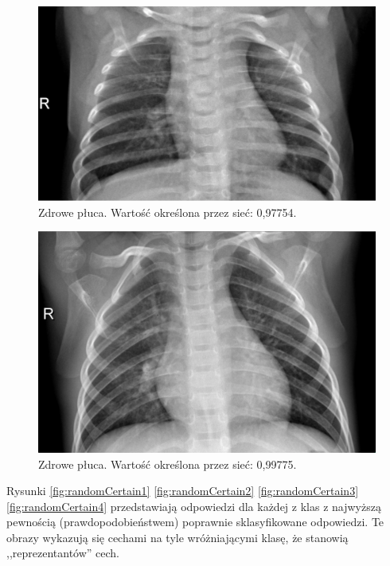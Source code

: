 \documentclass[12pt,a4paper,twoside,titlepage,openright]{book}
\begin{document}
\begin{itemize}
\begin{itemize}
\begin{figure}[ht]
	\centering
			\includegraphics[resolution=100, scale=0.3]{randomIncorrect3.png}
		\caption{Zdrowe płuca. Wartość określona przez sieć: 0,97754.}
				\label{fig:randomIncorrect3}
\end{figure}

\begin{figure}[ht]
	\centering
			\includegraphics[resolution=100, scale=0.3]{randomIncorrect4.png}
		\caption{Zdrowe płuca. Wartość określona przez sieć: 0,99775.}
				\label{fig:randomIncorrect4}
\end{figure}

Rysunki \ref{fig:randomCertain1} \ref{fig:randomCertain2} \ref{fig:randomCertain3} \ref{fig:randomCertain4} przedstawiają odpowiedzi dla każdej z klas z najwyższą pewnością (prawdopodobieństwem) poprawnie sklasyfikowane odpowiedzi. Te obrazy wykazują się cechami na tyle wróżniającymi klasę, że stanowią ,,reprezentantów'' cech.



\end{itemize}
\end{itemize}
\end{document}
